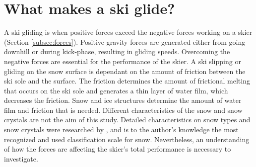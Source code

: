 \section{What makes a ski glide?}
\label{sec:skiglide}
A ski gliding is when positive forces exceed the negative forces working on a skier (Section \ref{subsec:forces}). Positive gravity forces are generated either from going downhill or during kick-phase, resulting in gliding speeds. Overcoming the negative forces are essential for the performance of the skier. A ski slipping or gliding on the snow surface is dependant on the amount of friction between the ski sole and the surface. The friction determines the amount of frictional melting that occurs on the ski sole and generates a thin layer of water film, which decreases the friction. Snow and ice structures determine the amount of water film and friction that is needed. Different characteristics of the snow and snow crystals are not the aim of this study. Detailed characteristics on snow types and snow crystals were researched by \cite{ColbeckSC1986}, and is to the author's knowledge the most recognized and used classification scale for snow. Nevertheless, an understanding of how the forces are affecting the skier's total performance is necessary to investigate.

